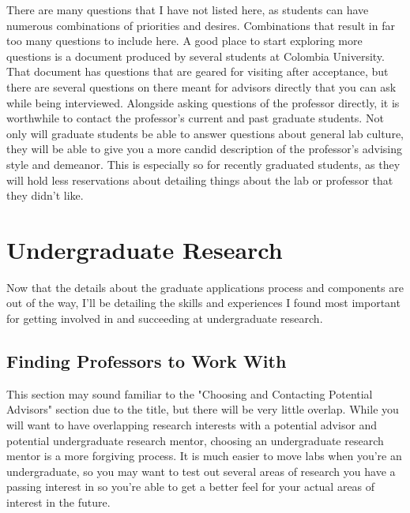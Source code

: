 \documentclass[12pt]{article}
\begin{document}
There are many questions that I have not listed here, as students can have numerous combinations of priorities and desires. Combinations that result in far too many questions to include here. A good place to start exploring more questions is a document produced by several students at Colombia University. \cite{colombiaquestions} That document has questions that are geared for visiting after acceptance, but there are several questions on there meant for advisors directly that you can ask while being interviewed. Alongside asking questions of the professor directly, it is worthwhile to contact the professor's current and past graduate students. Not only will graduate students be able to answer questions about general lab culture, they will be able to give you a more candid description of the professor's advising style and demeanor. This is especially so for recently graduated students, as they will hold less reservations about detailing things about the lab or professor that they didn't like.

\section{Undergraduate Research}

Now that the details about the graduate applications process and components are out of the way, I'll be detailing the skills and experiences I found most important for getting involved in and succeeding at undergraduate research.

\subsection{Finding Professors to Work With}

This section may sound familiar to the "Choosing and Contacting Potential Advisors" section due to the title, but there will be very little overlap. While you will want to have overlapping research interests with a potential advisor and potential undergraduate research mentor, choosing an undergraduate research mentor is a more forgiving process. It is much easier to move labs when you're an undergraduate, so you may want to test out several areas of research you have a passing interest in so you're able to get a better feel for your actual areas of interest in the future. 
\end{document}
